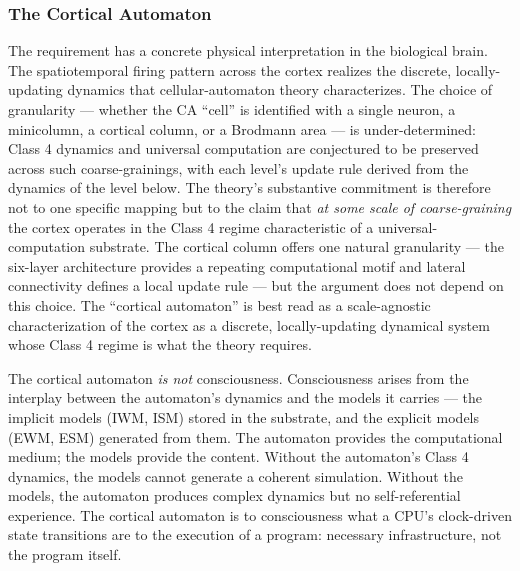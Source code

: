 \documentclass[12pt]{article}
\begin{document}
\subsubsection{The Cortical Automaton}

The requirement has a concrete physical interpretation in the biological brain. The spatiotemporal firing pattern across the cortex realizes the discrete, locally-updating dynamics that cellular-automaton theory characterizes. The choice of granularity --- whether the CA ``cell'' is identified with a single neuron, a minicolumn, a cortical column, or a Brodmann area --- is under-determined: Class 4 dynamics and universal computation are conjectured to be preserved across such coarse-grainings, with each level's update rule derived from the dynamics of the level below. The theory's substantive commitment is therefore not to one specific mapping but to the claim that \emph{at some scale of coarse-graining} the cortex operates in the Class 4 regime characteristic of a universal-computation substrate. The cortical column offers one natural granularity --- the six-layer architecture provides a repeating computational motif and lateral connectivity defines a local update rule --- but the argument does not depend on this choice. The ``cortical automaton'' is best read as a scale-agnostic characterization of the cortex as a discrete, locally-updating dynamical system whose Class 4 regime is what the theory requires.

The cortical automaton \emph{is not} consciousness. Consciousness arises from the interplay between the automaton's dynamics and the models it carries --- the implicit models (IWM, ISM) stored in the substrate, and the explicit models (EWM, ESM) generated from them. The automaton provides the computational medium; the models provide the content. Without the automaton's Class 4 dynamics, the models cannot generate a coherent simulation. Without the models, the automaton produces complex dynamics but no self-referential experience. The cortical automaton is to consciousness what a CPU's clock-driven state transitions are to the execution of a program: necessary infrastructure, not the program itself.
\end{document}
